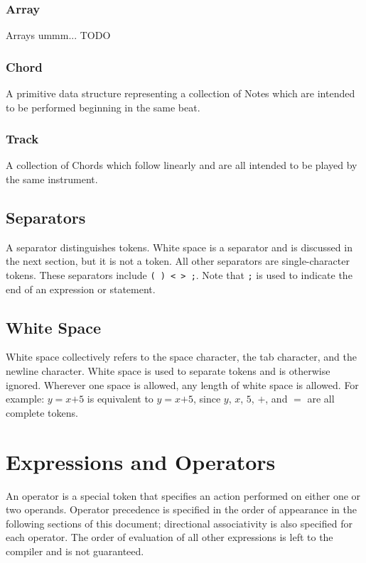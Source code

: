 \documentclass[letterpaper]{article}
\begin{document}
\subsubsection{Array}
Arrays ummm... TODO 
\subsubsection{Chord}
A primitive data structure representing a collection of Notes which are intended to be performed beginning in the same beat. 
\subsubsection{Track}
A collection of Chords which follow linearly and are all intended to be played by the same instrument.

\subsection{Separators}
A separator distinguishes tokens. White space is a separator and is discussed in the next section, but it is not a token. All other separators are single-character tokens. These separators include \texttt{( ) \textless\  \textgreater\  ;}. Note that \texttt{;}  is used to indicate the end of an expression or statement. 

\subsection{White Space}
White space collectively refers to the space character, the tab character, and the newline character. White space is used to separate tokens and is otherwise ignored. Wherever one space is allowed, any length of white space is allowed.
For example: $y$$=$$x$$+$$5$ is equivalent to $y$\textvisiblespace $=$\textvisiblespace  \textvisiblespace $x$\textvisiblespace $+$\textvisiblespace $5$, since $y$, $x$, $5$, $+$, and $=$ are all complete tokens.

\section{Expressions and Operators}
An operator is a special token that specifies an action performed on either one or two operands. Operator precedence is specified in the order of appearance in the following sections of this document; directional associativity is also specified for each operator. The order of evaluation of all other expressions is left to the compiler and is not guaranteed.
\end{document}
